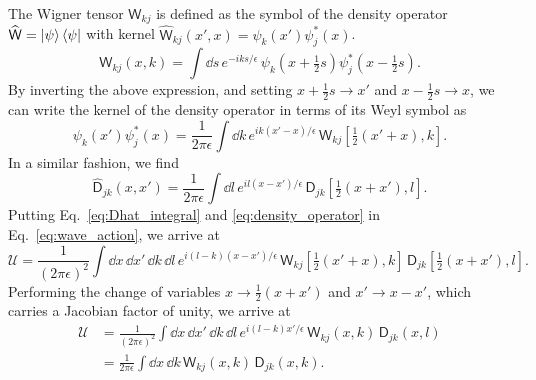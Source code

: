 The Wigner tensor $\mathsf{W}_{kj}$ is defined as the symbol of the density operator $\widehat{\mathsf{W}} = \mathinner{\lvert{\psi}\rangle}\mathinner{\langle{\psi}\rvert}$ with kernel $\widehat{\mathsf{W}}_{kj}(x',x) = \psi_{k}(x')\psi_{j}^{*}(x)$.
%
\begin{equation}
  \mathsf{W}_{kj}(x, k) = \int \dd{s}\, e^{-iks/\epsilon}\, \psi_{k}\left(x + \tfrac{1}{2}s\right)\psi^{*}_{j}\left(x - \tfrac{1}{2}s\right).
\end{equation}
%
By inverting the above expression, and setting $x + \frac{1}{2}s \to x'$ and $x- \frac{1}{2}s \to x$, we can write the kernel of the density operator in terms of its Weyl symbol as
%
%
\begin{equation}
  \psi_{k}(x') \psi^{*}_{j}(x) = \frac{1}{2\pi \epsilon} \int \dd{k}\, e^{ik(x' -x)/\epsilon}\,\mathsf{W}_{kj}\left[\tfrac{1}{2}(x' + x), k\right].
  \label{eq:density_operator}
\end{equation}
%
In a similar fashion, we find
%
\begin{equation}
  \widehat{\mathsf{D}}_{jk}(x, x') = \frac{1}{2\pi\epsilon} \int \dd{l}\, e^{il(x -x')/\epsilon}\,\mathsf{D}_{jk}\left[\tfrac{1}{2}(x + x'), l\right].
  \label{eq:Dhat_integral}
\end{equation}
%
Putting Eq.~\eqref{eq:Dhat_integral} and \eqref{eq:density_operator} in Eq.~\eqref{eq:wave_action}, we arrive at
%
\begin{equation}
  \mathscr{U} = \frac{1}{(2\pi\epsilon)^{2}}\int \dd{x}\,\dd{x'}\,\dd{k}\,\dd{l}\, e^{i(l-k)(x -x')/\epsilon}\,\mathsf{W}_{kj}\left[\tfrac{1}{2}(x' + x), k\right]\, \mathsf{D}_{jk}\left[\tfrac{1}{2}(x + x'), l\right].
\end{equation}
%
Performing the change of variables $x \to \frac{1}{2}(x + x')$ and $x' \to x - x'$, which carries a Jacobian factor of unity, we arrive at
%
\begin{equation}
  \begin{aligned}
    \mathscr{U} &= \frac{1}{(2\pi\epsilon)^{2}}\int \dd{x}\,\dd{x'}\,\dd{k}\,\dd{l}\, e^{i(l-k)x'/\epsilon}\,\mathsf{W}_{kj}(x, k)\, \mathsf{D}_{jk}(x, l)\\
                &= \frac{1}{2\pi\epsilon}\int \dd{x}\,\dd{k}\,\mathsf{W}_{kj}(x,k)\,\mathsf{D}_{jk}(x, k).
  \end{aligned}
  \label{eq:wave_action_symbol_form}
\end{equation}
%

